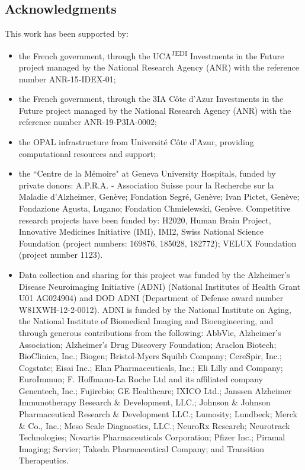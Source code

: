 \subsection*{Acknowledgments}
\label{sec:ack}

This work has been supported by:
\begin{itemize}
%
\item the French government, through the UCA\textsuperscript{JEDI} Investments in the Future project managed by the National Research Agency (ANR) with the reference number ANR-15-IDEX-01;
%
\item the French government, through the 3IA Côte d'Azur Investments in the Future project managed by the National Research Agency (ANR) with the reference number ANR-19-P3IA-0002;
%
\item the OPAL infrastructure from Université Côte d'Azur, providing computational resources and support;
%
\item the ``Centre de la Mémoire" at Geneva University Hospitals, funded by private donors:
A.P.R.A. - Association Suisse pour la Recherche sur la Maladie d’Alzheimer, Genève;
Fondation Segré, Genève;
Ivan Pictet, Genève;
Fondazione Agusta, Lugano;
Fondation Chmielewski, Genève.
Competitive research projects have been funded by: H2020, Human Brain Project, Innovative Medicines Initiative (IMI), IMI2, Swiss National Science Foundation (project numbers: 169876, 185028, 182772);
VELUX Foundation (project number 1123).
%
\item Data collection and sharing for this project was funded by the Alzheimer's Disease Neuroimaging Initiative (ADNI) (National Institutes of Health Grant U01 AG024904) and DOD ADNI (Department of Defense award number W81XWH-12-2-0012).
ADNI is funded by the National Institute on Aging, the National Institute of Biomedical Imaging and Bioengineering, and through generous contributions from the following:
AbbVie, Alzheimer's Association; Alzheimer's Drug Discovery Foundation; Araclon Biotech; BioClinica, Inc.; Biogen; Bristol-Myers Squibb Company; CereSpir, Inc.; Cogstate; Eisai Inc.; Elan Pharmaceuticals, Inc.; Eli Lilly and Company; EuroImmun; F. Hoffmann-La Roche Ltd and its affiliated company Genentech, Inc.; Fujirebio; GE Healthcare; IXICO Ltd.; Janssen Alzheimer Immunotherapy Research \& Development, LLC.; Johnson \& Johnson Pharmaceutical Research \& Development LLC.; Lumosity; Lundbeck; Merck \& Co., Inc.; Meso Scale Diagnostics, LLC.; NeuroRx Research; Neurotrack Technologies; Novartis Pharmaceuticals Corporation; Pfizer Inc.; Piramal Imaging; Servier; Takeda Pharmaceutical Company; and Transition Therapeutics.

\end{itemize}
